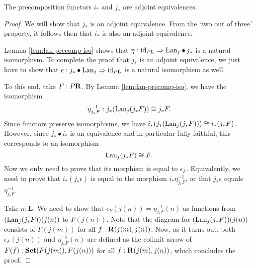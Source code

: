 \begin{lemma}\label{lem:equivalent-presheaf-cats}
  The precomposition functors $ i_* $ and $ j_* $ are adjoint equivalences.
\end{lemma}
\begin{proof}
  We will show that $ j_* $ is an adjoint equivalence. From the `two out of three' property, it follows then that $ i_* $ is also an adjoint equivalence.

  Lemma \ref{lem:lan-precomp-iso} shows that $ \eta: \text{id}_{P \mathbf L} \Rightarrow \text{Lan}_{j} \bullet j_* $ is a natural isomorphism. To complete the proof that $ j_* $ is an adjoint equivalence, we just have to show that $ \epsilon: j_* \bullet \text{Lan}_{j} \Rightarrow \text{id}_{P \mathbf L} $ is a natural isomorphism as well.

  To this end, take $ F : P \mathbf{R} $. By Lemma \ref{lem:lan-precomp-iso}, we have the isomorphism
  \[ \eta^{-1}_{j_* F}: j_* (\text{Lan}_{j}(j_* F)) \cong j_* F. \]
  Since functors preserve isomorphisms, we have $ i_* (j_* (\text{Lan}_{j}(j_* F))) \cong i_* (j_* F) $. However, since $ j_* \bullet i_* $ is an equivalence and in particular fully faithful, this corresponds to an isomorphism
  \[ \text{Lan}_{j}(j_* F) \cong F. \]
  Now we only need to prove that its morphism is equal to $ \epsilon_F $. Equivalently, we need to prove that $ i_* (j_* \epsilon) $ is equal to the morphism $ i_* \eta_{j_* F}^{-1} $, or that $ j_* \epsilon $ equals $ \eta^{-1}_{j_* F} $.

  Take $ n : \mathbf L $. We need to show that $ \epsilon_F (j(n)) = \eta_{j_* F}^{-1}(n) $ as functions from $ (\text{Lan}_{j} (j_* F)) (j(n)) $ to $ F(j(n)) $. Note that the diagram for $ (\text{Lan}_{j} (j_* F)) (j(n)) $ consists of $ F(j(m)) $ for all $ f: \mathbf{R}(j(m), j(n)) $. Now, as it turns out, both $ \epsilon_F (j(n)) $ and $ \eta_{j_* F}^{-1}(n) $ are defined as the colimit arrow of $ F(f) : \mathbf{Set}(F(j(m)), F(j(n))) $ for all $ f: \mathbf{R}(j(m), j(n)) $, which concludes the proof.
\end{proof}

